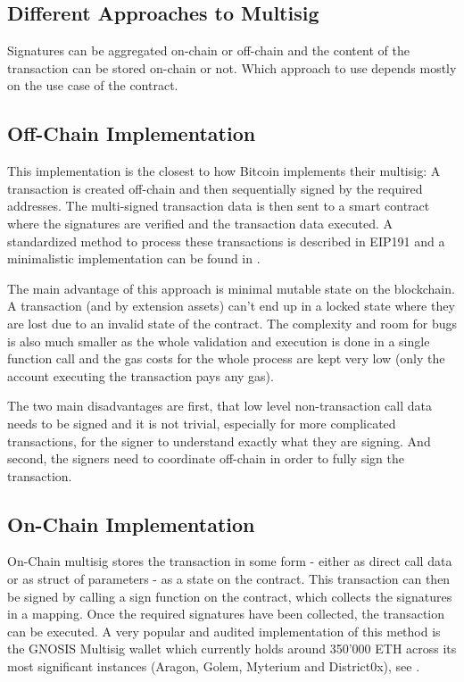 \documentclass[12pt,a4paper,titlepage,oneside,english]{article}
\begin{document}
\subsection{Different Approaches to Multisig}
Signatures can be aggregated on-chain or off-chain and the content of the transaction can be stored on-chain or not. Which approach to use depends mostly on the use case of the contract.

\subsection{Off-Chain Implementation}
This implementation is the closest to how Bitcoin implements their multisig: A transaction is created off-chain and then sequentially signed by the required addresses. The multi-signed transaction data is then sent to a smart contract where the signatures are verified and the transaction data executed. A standardized method to process these transactions is described in EIP191 and a minimalistic implementation can be found in \cite{Lundkvist}.

The main advantage of this approach is minimal mutable state on the blockchain. A transaction (and by extension assets) can't end up in a locked state where they are lost due to an invalid state of the contract. The complexity and room for bugs is also much smaller as the whole validation and execution is done in a single function call and the gas costs for the whole process are kept very low (only the account executing the transaction pays any gas).

The two main disadvantages are first, that low level non-transaction call data needs to be signed and it is not trivial, especially for more complicated transactions, for the signer to understand exactly what they are signing. And second, the signers need to coordinate off-chain in order to fully sign the transaction.

\subsection{On-Chain Implementation}
On-Chain multisig stores the transaction in some form - either as direct call data or as struct of parameters - as a state on the contract. This transaction can then be signed by calling a sign function on the contract, which collects the signatures in a mapping. Once the required signatures have been collected, the transaction can be executed. A very popular and audited implementation of this method is the GNOSIS Multisig wallet which currently holds around 350'000 ETH across its most significant instances (Aragon, Golem, Myterium and District0x), see \cite{GNOSISLtd.2019}.
\end{document}
